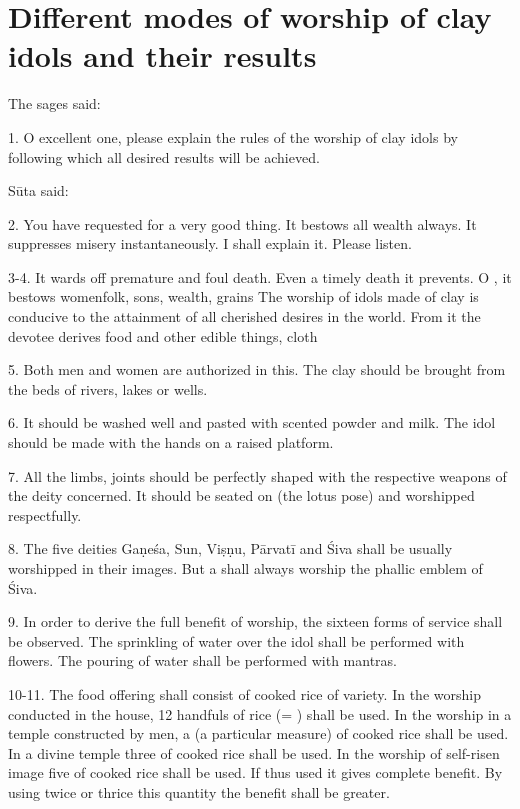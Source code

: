 \chapter{Different modes of worship of clay idols and their results}

The sages said:

1. O excellent one, please explain the rules of the worship of clay idols by
following which all desired results will be achieved.

Sūta said:

2. You have requested for a very good thing. It bestows all wealth always. It
suppresses misery instantaneously. I shall explain it. Please listen.

3-4. It wards off premature and foul death. Even a timely death it prevents.
O , it bestows womenfolk, sons, wealth, grains \etc The worship of
idols made of clay \etc is conducive to the attainment of all cherished desires
in the world. From it the devotee derives food and other edible things,
cloth \etc

5. Both men and women are authorized in this. The clay should be brought from
the beds of rivers, lakes or wells.

6. It should be washed well and pasted with scented powder and milk. The idol
should be made with the hands on a raised platform.

7. All the limbs, joints \etc should be perfectly shaped with the respective
weapons of the deity concerned. It should be seated on 
(the lotus pose) and worshipped respectfully.

8. The five deities Gaṇeśa, Sun, Viṣṇu, Pārvatī and Śiva shall be usually
worshipped in their images. But a  shall always worship the phallic
emblem of Śiva.

9. In order to derive the full benefit of worship, the sixteen forms of service
shall be observed. The sprinkling of water over the idol shall be performed with
flowers. The pouring of water shall be performed with mantras.

10-11. The food offering shall consist of cooked rice of  variety. In
the worship conducted in the house, 12 handfuls of rice (= ) shall be
used. In the worship in a temple constructed by men, a 
(a particular measure) of cooked rice shall be used. In a divine temple three
 of cooked rice shall be used. In the worship of self-risen image
five  of cooked rice shall be used. If thus used it gives complete
benefit. By using twice or thrice this quantity the benefit shall be greater.

